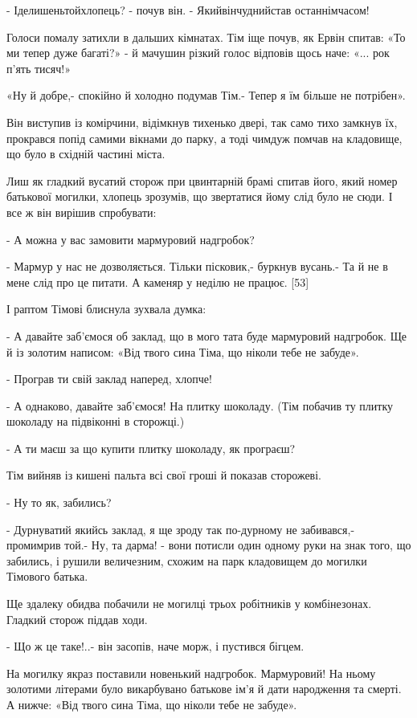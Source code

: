 - Іделишеньтойхлопець? - почув він. - Якийвінчуднийстав останнімчасом!

Голоси помалу затихли в дальших кімнатах. Тім іще почув, як Ервін спитав: «То ми тепер дуже багаті?» - й мачушин різкий голос відповів щось наче: «... рок п'ять тисяч!»

«Ну й добре,- спокійно й холодно подумав Тім.- Тепер я їм більше не потрібен».

Він виступив із комірчини, відімкнув тихенько двері, так само тихо замкнув їх, прокрався попід самими вікнами до парку, а тоді чимдуж помчав на кладовище, що було в східній частині міста.

Лиш як гладкий вусатий сторож при цвинтарній брамі спитав його, який номер батькової могилки, хлопець зрозумів, що звертатися йому слід було не сюди. І все ж він вирішив спробувати:

- А можна у вас замовити мармуровий надгробок?

- Мармур у нас не дозволяється. Тільки пісковик,- буркнув вусань.- Та й не в мене слід про це питати. А каменяр у неділю не працює. [53]

І раптом Тімові блиснула зухвала думка:

- А давайте заб'ємося об заклад, що в мого тата буде мармуровий надгробок. Ще й із золотим написом: «Від твого сина Тіма, що ніколи тебе не забуде».

- Програв ти свій заклад наперед, хлопче!

- А однаково, давайте заб'ємося! На плитку шоколаду. (Тім побачив ту плитку шоколаду на підвіконні в сторожці.)

- А ти маєш за що купити плитку шоколаду, як програєш?

Тім вийняв із кишені пальта всі свої гроші й показав сторожеві.

- Ну то як, забились?

- Дурнуватий якийсь заклад, я ще зроду так по-дурному не забивався,- промимрив той.- Ну, та дарма! - вони потисли один одному руки на знак того, що забились, і рушили величезним, схожим на парк кладовищем до могилки Тімового батька.

Ще здалеку обидва побачили не могилці трьох робітників у комбінезонах. Гладкий сторож піддав ходи.

- Що ж це таке!..- він засопів, наче морж, і пустився бігцем.

На могилку якраз поставили новенький надгробок. Мармуровий! На ньому золотими літерами було викарбувано батькове ім'я й дати народження та смерті. А нижче: «Від твого сина Тіма, що ніколи тебе не забуде».

